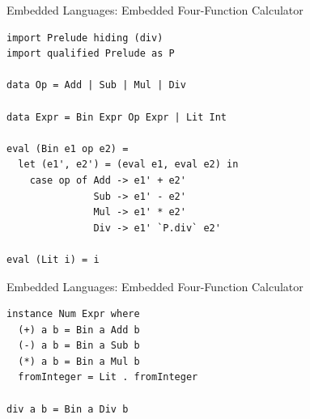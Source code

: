 \documentclass[xcolor=dvipsnames]{beamer}
\begin{document}
%
\begin{frame}[fragile]{Embedded Languages: {\small Embedded Four-Function Calculator}}

\begin{block}{}
\begin{verbatim} 
import Prelude hiding (div) 
import qualified Prelude as P

data Op = Add | Sub | Mul | Div 

data Expr = Bin Expr Op Expr | Lit Int 

eval (Bin e1 op e2) =
  let (e1', e2') = (eval e1, eval e2) in
    case op of Add -> e1' + e2'
               Sub -> e1' - e2'
               Mul -> e1' * e2'
               Div -> e1' `P.div` e2'

eval (Lit i) = i
\end{verbatim}  
\end{block} 

\end{frame} 

%
\begin{frame}[fragile]{Embedded Languages: {\small Embedded Four-Function Calculator}} 

\begin{block}{}
\begin{verbatim} 
instance Num Expr where
  (+) a b = Bin a Add b 
  (-) a b = Bin a Sub b
  (*) a b = Bin a Mul b 
  fromInteger = Lit . fromInteger

div a b = Bin a Div b 
\end{verbatim}  
\end{block} 

\end{frame} 
\end{document}
